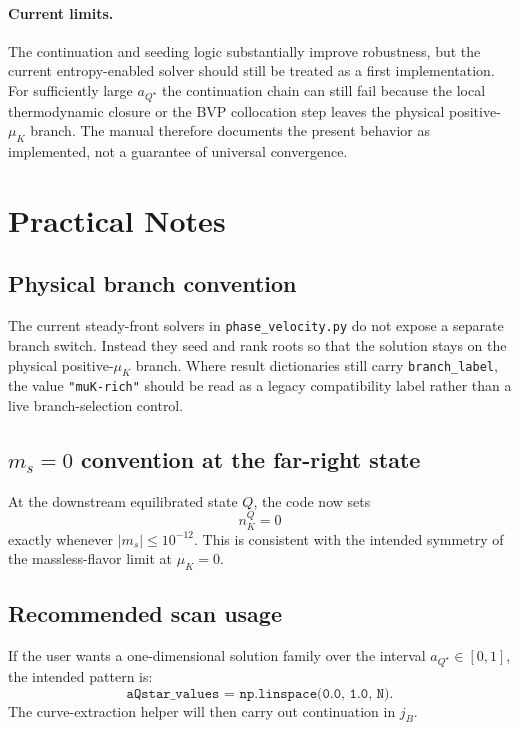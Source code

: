 \documentclass[11pt]{article}
\begin{document}
\paragraph{Current limits.}
The continuation and seeding logic substantially improve robustness, but the
current entropy-enabled solver should still be treated as a first
implementation. For sufficiently large $a_{Q^\star}$ the continuation chain
can still fail because the local thermodynamic closure or the BVP collocation
step leaves the physical positive-$\mu_K$ branch. The manual therefore documents
the present behavior as implemented, not a guarantee of universal convergence.

\section{Practical Notes}
\subsection{Physical branch convention}
The current steady-front solvers in \texttt{phase\_velocity.py} do not expose a
separate branch switch. Instead they seed and rank roots so that the solution
stays on the physical positive-$\mu_K$ branch. Where result dictionaries still
carry \texttt{branch\_label}, the value \texttt{"muK-rich"} should be read as a
legacy compatibility label rather than a live branch-selection control.

\subsection{\texorpdfstring{$m_s = 0$ convention at the far-right state}{ms = 0 convention at the far-right state}}
At the downstream equilibrated state $Q$, the code now sets
\[
n_K^Q = 0
\]
exactly whenever $|m_s| \le 10^{-12}$. This is consistent with the intended
symmetry of the massless-flavor limit at $\mu_K = 0$.

\subsection{Recommended scan usage}
If the user wants a one-dimensional solution family over the interval
$a_{Q^\star} \in [0,1]$, the intended pattern is:
\begin{equation}
\texttt{aQstar\_values = np.linspace(0.0, 1.0, N)}.
\end{equation}
The curve-extraction helper will then carry out continuation in $j_B$.
\end{document}
